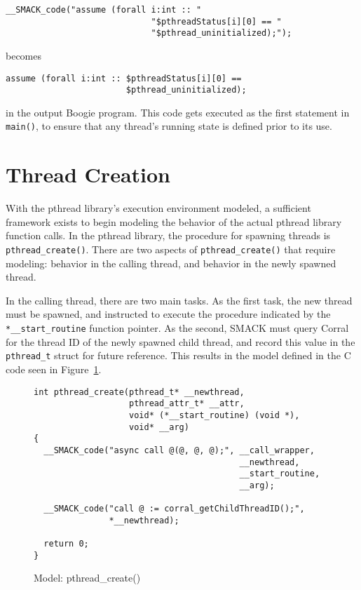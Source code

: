 \begin{lstlisting}[frame=none,xleftmargin=2\parindent]
__SMACK_code("assume (forall i:int :: "
                             "$pthreadStatus[i][0] == "
                             "$pthread_uninitialized);"); 
\end{lstlisting}

\noindent becomes 

\begin{lstlisting}[frame=none,xleftmargin=2\parindent,language=boogie]
assume (forall i:int :: $pthreadStatus[i][0] == 
                        $pthread_uninitialized);
\end{lstlisting}

\noindent in the output Boogie program.  This code gets executed as
the first statement in \lstinline|main()|, to ensure that any thread's
running state is defined prior to its use. 

\section{Thread Creation}
With the pthread library's execution environment modeled, a sufficient
framework exists to begin modeling the behavior of the actual pthread
library function calls.  In the pthread library, the procedure for
spawning threads is \lstinline|pthread_create()|.  There are two
aspects of \lstinline|pthread_create()| that require modeling:
behavior in the calling thread, and behavior in the newly spawned
thread. 

In the calling thread, there are two main tasks.  As the first task,
the new thread must be spawned, and instructed to execute the
procedure indicated by the \lstinline|*__start_routine| function
pointer.  As the second, SMACK must query Corral for the thread ID of
the newly spawned child thread, and record this value in the
\lstinline|pthread_t| struct for future reference.  This results in
the model defined in the C code seen in Figure~\ref{fig:pthread_create}.

\begin{figure}[!ht]
\centering
\begin{lstlisting}
int pthread_create(pthread_t* __newthread,
                   pthread_attr_t* __attr,
                   void* (*__start_routine) (void *),
                   void* __arg)
{
  __SMACK_code("async call @(@, @, @);", __call_wrapper,
                                         __newthread,
                                         __start_routine,
                                         __arg);

  __SMACK_code("call @ := corral_getChildThreadID();",
               *__newthread);

  return 0;
}
\end{lstlisting}
\caption{Model: pthread\_create()}\label{fig:pthread_create}
\end{figure}

